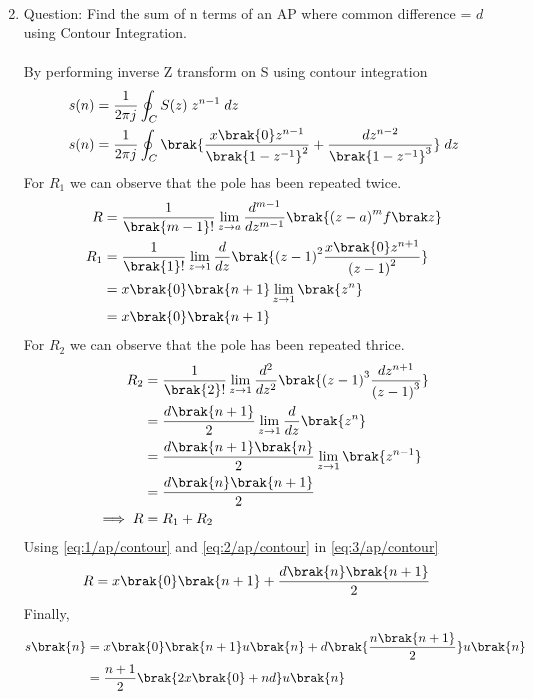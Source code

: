 \begin{enumerate}[label=\thechapter.\arabic*,ref=\thechapter.\theenumi]
\begin{align}
\end{align}
\item 
Question: Find the sum of n terms of an AP where common difference = $d$ using Contour Integration.\\
\solution\\
By performing inverse Z transform on S using contour integration
\begin{align}
   s(n)&=\frac{1}{2\pi j}\oint_{C}S(z) \;z^{n-1} \;dz  \\
   s(n)&=\frac{1}{2\pi j}\oint_{C}\brak{\dfrac{x\brak{0}z^{n-1}}{\brak{1-z^{-1}}^2} + \dfrac{dz^{n-2}}{\brak{1-z^{-1}}^{3}}}\;dz  
\end{align}
For $R_1$ we can observe that the pole has been repeated twice.
\begin{align}
    R&=\frac{1}{\brak {m-1}!}\lim\limits_{z\to a}\frac{d^{m-1}}{dz^{m-1}}\brak {{(z-a)}^{m}f\brak z}\\
    R_1&=\frac{1}{\brak {1}!}\lim\limits_{z\to 1}\frac{d}{dz}\brak {{(z-1)}^{2}\frac{x\brak{0}z^{n+1}}{{(z-1)}^2}}\\
    &=x\brak{0}\brak{n+1}\lim\limits_{z\to 1}\brak{z^n}\\
    &=x\brak{0}\brak{n+1}\label{eq:1/ap/contour}
\end{align}
For $R_2$ we can observe that the pole has been repeated thrice.
\begin{align}
    R_2&=\frac{1}{\brak {2}!}\lim\limits_{z\to 1}\frac{d^{2}}{dz^{2}}\brak {{(z-1)}^{3}\frac{dz^{n+1}}{{(z-1)}^3}}\\
    &=\frac{d\brak{n+1}}{2}\lim\limits_{z\to 1}\frac{d}{dz}\brak{z^n}\\
    &=\frac{d\brak{n+1}\brak{n}}{2}\lim\limits_{z\to 1}\brak{z^{n-1}}\\
    &=\frac{d\brak{n}\brak{n+1}}{2}\label{eq:2/ap/contour} \\
    \implies R&= R_1 + R_2\label{eq:3/ap/contour}
\end{align}
Using \eqref{eq:1/ap/contour} and \eqref{eq:2/ap/contour} in \eqref{eq:3/ap/contour}
\begin{align}
   R &=x\brak{0}\brak{n+1}+\frac{d\brak{n}\brak{n+1}}{2}
\end{align}
Finally,
\begin{align}
    s\brak{n}&=x\brak{0}\brak{n+1}u\brak{n}+d\brak{\dfrac{{n\brak{n+1}}}{2}}u\brak{n}\\
    &=\dfrac{n+1}{2}\brak{2x\brak{0}+nd}u\brak{n}
\end{align}

\end{enumerate}
